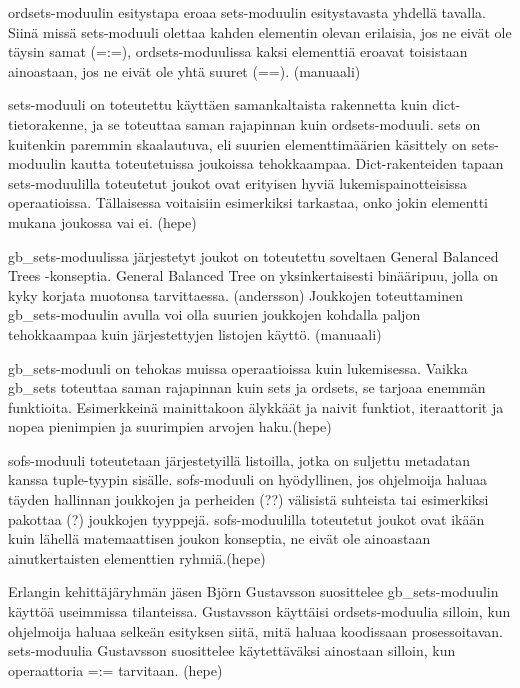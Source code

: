 \documentclass[11pt,oneside,a4paper]{article}
\begin{document}
ordsets-moduulin esitystapa eroaa sets-moduulin esitystavasta yhdellä tavalla.
Siinä missä sets-moduuli olettaa kahden elementin olevan erilaisia, jos ne eivät
ole täysin samat (=:=), ordsets-moduulissa kaksi elementtiä eroavat toisistaan
ainoastaan, jos ne eivät ole yhtä suuret (==). (manuaali)

sets-moduuli on toteutettu käyttäen samankaltaista rakennetta kuin
dict-tietorakenne, ja se toteuttaa saman rajapinnan kuin ordsets-moduuli.
sets on kuitenkin paremmin skaalautuva, eli suurien elementtimäärien käsittely
on sets-moduulin kautta toteutetuissa joukoissa tehokkaampaa. Dict-rakenteiden
tapaan sets-moduulilla toteutetut joukot ovat erityisen hyviä
lukemispainotteisissa operaatioissa. Tällaisessa voitaisiin esimerkiksi
tarkastaa, onko jokin elementti mukana joukossa vai ei. (hepe)

gb\_sets-moduulissa järjestetyt joukot on toteutettu soveltaen General Balanced
Trees -konseptia. General Balanced Tree on yksinkertaisesti binääripuu, jolla on
kyky korjata muotonsa tarvittaessa. (andersson) Joukkojen toteuttaminen
gb\_sets-moduulin avulla voi olla suurien
joukkojen kohdalla paljon tehokkaampaa kuin järjestettyjen listojen käyttö.
(manuaali)

gb\_sets-moduuli on tehokas muissa operaatioissa kuin lukemisessa. Vaikka
gb\_sets toteuttaa saman rajapinnan kuin sets ja ordsets, se tarjoaa enemmän
funktioita.
Esimerkkeinä mainittakoon älykkäät ja naivit funktiot, iteraattorit ja nopea
pienimpien ja suurimpien arvojen haku.(hepe)

sofs-moduuli toteutetaan järjestetyillä listoilla, jotka on suljettu metadatan
kanssa tuple-tyypin sisälle. sofs-moduuli on hyödyllinen, jos ohjelmoija haluaa
täyden hallinnan joukkojen ja perheiden (??) välisistä suhteista tai esimerkiksi
pakottaa (?) joukkojen tyyppejä. sofs-moduulilla toteutetut joukot ovat ikään
kuin lähellä matemaattisen joukon konseptia, ne eivät ole ainoastaan
ainutkertaisten elementtien ryhmiä.(hepe)


Erlangin kehittäjäryhmän jäsen Björn Gustavsson suosittelee gb\_sets-moduulin
käyttöä useimmissa tilanteissa. Gustavsson käyttäisi ordsets-moduulia silloin,
kun ohjelmoija haluaa selkeän esityksen siitä, mitä haluaa koodissaan
prosessoitavan. sets-moduulia Gustavsson suosittelee käytettäväksi ainostaan
silloin, kun operaattoria =:= tarvitaan.  (hepe)
\end{document}
